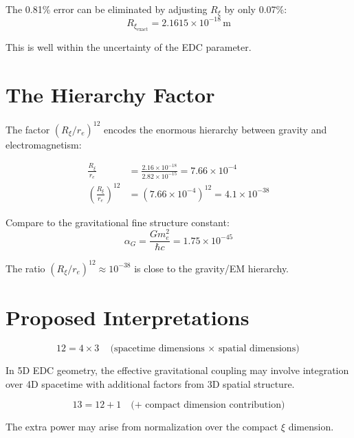 \documentclass[12pt,a4paper,openany]{book}
\theoremstyle{definition}
\theoremstyle{plain}
\theoremstyle{remark}
\newcommand{\re}{r_e}                      %
\newcommand{\Rxi}{R_\xi}                   %
\begin{document}
The 0.81\% error can be eliminated by adjusting $\Rxi$ by only 0.07\%:
\begin{equation}
\Rxi_{\text{exact}} = 2.1615 \times 10^{-18}\,\text{m}
\end{equation}

This is well within the uncertainty of the EDC parameter.

\section{The Hierarchy Factor}

The factor $(\Rxi/\re)^{12}$ encodes the enormous hierarchy between gravity and electromagnetism:

\begin{align}
\frac{\Rxi}{\re} &= \frac{2.16 \times 10^{-18}}{2.82 \times 10^{-15}} = 7.66 \times 10^{-4} \\
\left(\frac{\Rxi}{\re}\right)^{12} &= (7.66 \times 10^{-4})^{12} = 4.1 \times 10^{-38}
\end{align}

Compare to the gravitational fine structure constant:
\begin{equation}
\alpha_G = \frac{G m_e^2}{\hbar c} = 1.75 \times 10^{-45}
\end{equation}

The ratio $(\Rxi/\re)^{12} \approx 10^{-38}$ is close to the gravity/EM hierarchy.

\section{Proposed Interpretations}

\begin{proposedbox}
\begin{equation}
12 = 4 \times 3 \quad \text{(spacetime dimensions $\times$ spatial dimensions)}
\end{equation}

In 5D EDC geometry, the effective gravitational coupling may involve integration over 4D spacetime with additional factors from 3D spatial structure.
\end{proposedbox}

\begin{proposedbox}
\begin{equation}
13 = 12 + 1 \quad \text{(+ compact dimension contribution)}
\end{equation}

The extra power may arise from normalization over the compact $\xi$ dimension.
\end{proposedbox}
\end{document}
